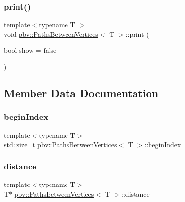 \subsubsection{\texorpdfstring{print()}{print()}}
{\footnotesize\ttfamily template$<$typename T $>$ \\
void \mbox{\hyperlink{structpbv_1_1_paths_between_vertices}{pbv\+::\+Paths\+Between\+Vertices}}$<$ T $>$\+::print (\begin{DoxyParamCaption}\item[{bool}]{show = {\ttfamily false} }\end{DoxyParamCaption})}



\subsection{Member Data Documentation}
\mbox{\label{structpbv_1_1_paths_between_vertices_abf43c3771ed161bb80a73fe39e5cc916}} 
\subsubsection{\texorpdfstring{begin\+Index}{beginIndex}}
{\footnotesize\ttfamily template$<$typename T$>$ \\
std\+::size\+\_\+t \mbox{\hyperlink{structpbv_1_1_paths_between_vertices}{pbv\+::\+Paths\+Between\+Vertices}}$<$ T $>$\+::begin\+Index}

\mbox{\label{structpbv_1_1_paths_between_vertices_a67aed042aa649d2b6dfeee29d3ec6416}} 
\subsubsection{\texorpdfstring{distance}{distance}}
{\footnotesize\ttfamily template$<$typename T$>$ \\
T$\ast$ \mbox{\hyperlink{structpbv_1_1_paths_between_vertices}{pbv\+::\+Paths\+Between\+Vertices}}$<$ T $>$\+::distance}

